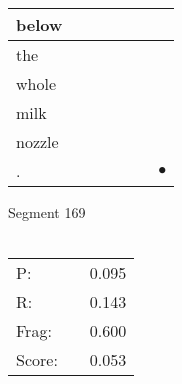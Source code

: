 \documentclass[landscape]{article}
\newcommand{\ssp}{\hspace{2pt}}
\newcommand{\mex}{\cellcolor{g}$\bullet$}
\begin{document}
\begin{tabular}{|l|p{10pt}|p{10pt}|p{10pt}|p{10pt}|p{10pt}|p{10pt}|}
\hline
\ssp below \ssp&\hspace{2pt}&\hspace{2pt}&\hspace{2pt}&\hspace{2pt}&\hspace{2pt}&\hspace{2pt}\\
\hline
\ssp the \ssp&\hspace{2pt}&\hspace{2pt}&\hspace{2pt}&\hspace{2pt}&\hspace{2pt}&\hspace{2pt}\\
\hline
\ssp whole \ssp&\hspace{2pt}&\hspace{2pt}&\hspace{2pt}&\hspace{2pt}&\hspace{2pt}&\hspace{2pt}\\
\hline
\ssp milk \ssp&\hspace{2pt}&\hspace{2pt}&\hspace{2pt}&\hspace{2pt}&\hspace{2pt}&\hspace{2pt}\\
\hline
\ssp nozzle \ssp&\hspace{2pt}&\hspace{2pt}&\hspace{2pt}&\hspace{2pt}&\hspace{2pt}&\hspace{2pt}\\
\hline
\ssp \cellcolor{ref5}. \ssp&\hspace{2pt}&\hspace{2pt}&\hspace{2pt}&\hspace{2pt}&\hspace{2pt}&\hspace{2pt}\mex\\
\hline
\end{tabular}

\vspace{6pt}
\noindent Segment 169\\\\
\noindent\begin{tabular}{lm{12pt}r}
\hline
P:&&0.095\\
R:&&0.143\\
Frag:&&0.600\\
Score:&&0.053\\
\end{tabular}
\end{document}
